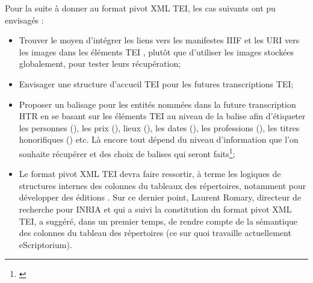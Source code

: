 Pour la suite à donner au format pivot XML TEI, les cas suivants ont pu envisagés :
\begin{itemize}
    \item Trouver le moyen d'intégrer les liens vers les manifestes IIIF et les URI vers les images dans les éléments TEI , plutôt que d'utiliser les images stockées globalement, pour tester leurs récupération;\\
    \item Envisager une structure d'accueil TEI pour les futures transcriptions TEI;\\
    \item Proposer un balisage pour les entités nommées dans la future transcription HTR en se basant sur les éléments TEI au niveau de la balise  afin d'étiqueter les personnes (), les prix (), lieux (), les dates (), les professions (), les titres honorifiques () etc. Là encore tout dépend du niveau d'information que l'on souhaite récupérer et des choix de balises qui seront faits\footnote{\cite{le_pevedic_retour_2016}};\\
    \item Le format pivot XML TEI devra faire ressortir, à terme les logiques de structures internes des colonnes du tableaux des répertoires, notamment pour développer des éditions . Sur ce dernier point, Laurent Romary, directeur de recherche pour INRIA et qui a suivi la constitution du format pivot XML TEI, a suggéré, dans un premier temps, de rendre compte de la sémantique des colonnes du tableau des répertoires (ce sur quoi travaille actuellement eScriptorium). 
    

\end{itemize}
